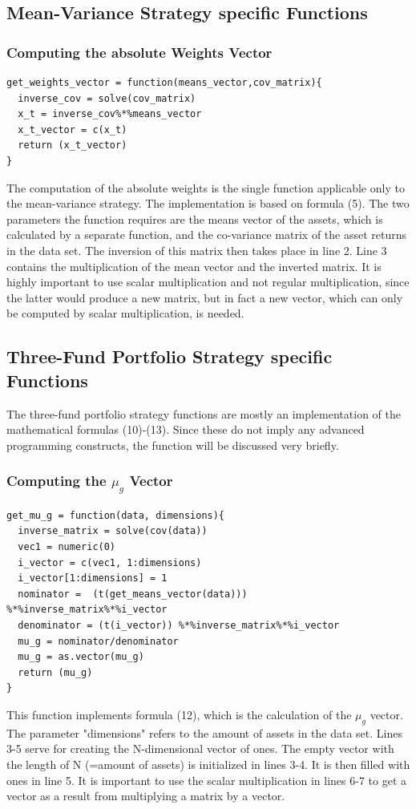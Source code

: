 \documentclass{article}
\begin{document}
\subsection{Mean-Variance Strategy specific Functions}
\subsubsection{Computing the absolute Weights Vector}
\begin{lstlisting}[caption={Computation of the absolute weights vector in R.}, label=code:1, frame=single]
get_weights_vector = function(means_vector,cov_matrix){
  inverse_cov = solve(cov_matrix)
  x_t = inverse_cov%*%means_vector
  x_t_vector = c(x_t)
  return (x_t_vector)
}
\end{lstlisting}
The computation of the absolute weights is the single function applicable only to the mean-variance strategy. The implementation is based on formula (5). The two parameters the function requires are the means vector of the assets, which is calculated by a separate function, and the co-variance matrix of the asset returns in the data set. The inversion of this matrix then takes place in line 2. Line 3 contains the multiplication of the mean vector and the inverted matrix. It is highly important to use scalar multiplication and not regular multiplication, since the latter would produce a new matrix, but in fact a new vector, which can only be computed by scalar multiplication, is needed.
\subsection{Three-Fund Portfolio Strategy specific Functions}
The three-fund portfolio strategy functions are mostly an implementation of the mathematical formulas (10)-(13). Since these do not imply any advanced programming constructs, the function will be discussed very briefly.
\subsubsection{Computing the $\mu_{g}$ Vector}
\begin{lstlisting}[caption={Computation of the $\mu_{g}$ vector in R.}, label=code:1, frame=single]
get_mu_g = function(data, dimensions){
  inverse_matrix = solve(cov(data))
  vec1 = numeric(0)
  i_vector = c(vec1, 1:dimensions)
  i_vector[1:dimensions] = 1
  nominator =  (t(get_means_vector(data))) %*%inverse_matrix%*%i_vector
  denominator = (t(i_vector)) %*%inverse_matrix%*%i_vector
  mu_g = nominator/denominator
  mu_g = as.vector(mu_g)
  return (mu_g)
}
\end{lstlisting}
This function implements formula (12), which is the calculation of the $\mu_{g}$ vector. The parameter "dimensions" refers to the amount of assets in the data set. Lines 3-5 serve for creating the N-dimensional vector of ones. The empty vector with the length of N (=amount of assets) is initialized in lines 3-4. It is then filled with ones in line 5. It is important to use the scalar multiplication in lines 6-7 to get a vector as a result from multiplying a matrix by a vector. 
\end{document}
